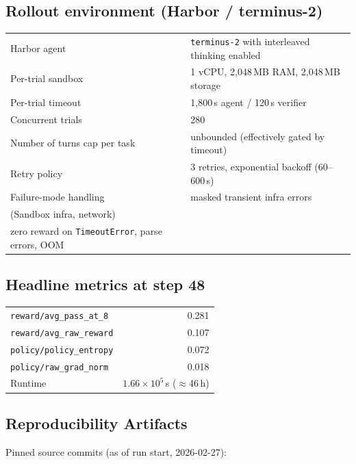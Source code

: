 \documentclass{llmxive}
\begin{document}
\subsection{Rollout environment (Harbor / terminus-2)}

\begin{tabular}{ll}
\toprule
Harbor agent                       & \texttt{terminus-2} with interleaved thinking enabled \\
Per-trial sandbox                  & 1 vCPU, 2{,}048\,MB RAM, 2{,}048\,MB storage \\
Per-trial timeout                  & 1{,}800\,s agent / 120\,s verifier \\
Concurrent trials                  & 280 \\
Number of turns cap per task               & unbounded (effectively gated by timeout) \\
Retry policy                       & 3 retries, exponential backoff (60--600\,s) \\
Failure-mode handling              & masked transient infra errors \\ (Sandbox infra, network) \\ zero reward on \texttt{TimeoutError}, parse errors, OOM \\
\bottomrule
\end{tabular}

\subsection{Headline metrics at step 48}

\begin{tabular}{lr}
\toprule
\texttt{reward/avg\_pass\_at\_8}     & 0.281 \\
\texttt{reward/avg\_raw\_reward}     & 0.107 \\
\texttt{policy/policy\_entropy}      & 0.072 \\
\texttt{policy/raw\_grad\_norm}      & 0.018 \\
Runtime                              & $1.66\times 10^{5}$\,s ($\approx$46\,h) \\
\bottomrule
\end{tabular}

\subsection{Reproducibility Artifacts}
Pinned source commits (as of run start, 2026-02-27):
\end{document}
